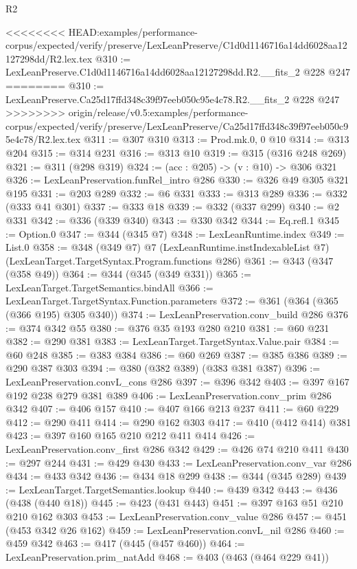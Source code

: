 \begin{lexlean}{R2}
\begin{coremodule}
{{{{{{{<<<<<<<< HEAD:examples/performance-corpus/expected/verify/preserve/LexLeanPreserve/C1d0d1146716a14dd6028aa12127298dd/R2.lex.tex
@310 := LexLeanPreserve.C1d0d1146716a14dd6028aa12127298dd.R2.__fits_2 @228 @247
========
@310 := LexLeanPreserve.Ca25d17ffd348c39f97eeb050c95e4c78.R2.__fits_2 @228 @247
>>>>>>>> origin/release/v0.5:examples/performance-corpus/expected/verify/preserve/LexLeanPreserve/Ca25d17ffd348c39f97eeb050c95e4c78/R2.lex.tex
@311 := @307 @310
@313 := Prod.mk.{0, 0} @10
@314 := @313 @204
@315 := @314 @231
@316 := @313 @10
@319 := @315 (@316 @248 @269)
@321 := @311 (@298 @319)
@324 := (acc : @205) -> (v : @10) -> @306 @321
@326 := LexLeanPreservation.funRel_intro @286
@330 := @326 @49 @305 @321 @195
@331 := @203 @289
@332 := @6 @331
@333 := @313 @289
@336 := @332 (@333 @41 @301)
@337 := @333 @18
@339 := @332 (@337 @299)
@340 := @2 @331
@342 := @336 (@339 @340)
@343 := @330 @342
@344 := Eq.refl.{1}
@345 := Option.{0}
@347 := @344 (@345 @7)
@348 := LexLeanRuntime.index
@349 := List.{0}
@358 := @348
    (@349 @7)
    @7
    (LexLeanRuntime.instIndexableList @7)
    (LexLeanTarget.TargetSyntax.Program.functions @286)
@361 := @343 (@347 (@358 @49))
@364 := @344 (@345 (@349 @331))
@365 := LexLeanTarget.TargetSemantics.bindAll
@366 := LexLeanTarget.TargetSyntax.Function.parameters
@372 := @361 (@364 (@365 (@366 @195) @305 @340))
@374 := LexLeanPreservation.conv_build @286
@376 := @374 @342 @55
@380 := @376 @35 @193 @280 @210
@381 := @60 @231
@382 := @290 @381
@383 := LexLeanTarget.TargetSyntax.Value.pair
@384 := @60 @248
@385 := @383 @384
@386 := @60 @269
@387 := @385 @386
@389 := @290 @387 @303
@394 := @380 (@382 @389) (@383 @381 @387)
@396 := LexLeanPreservation.convL_cons @286
@397 := @396 @342
@403 := @397 @167 @192 @238 @279 @381 @389
@406 := LexLeanPreservation.conv_prim @286 @342
@407 := @406 @157
@410 := @407 @166 @213 @237
@411 := @60 @229
@412 := @290 @411
@414 := @290 @162 @303
@417 := @410 (@412 @414) @381
@423 := @397 @160 @165 @210 @212 @411 @414
@426 := LexLeanPreservation.conv_first @286 @342
@429 := @426 @74 @210 @411
@430 := @297 @244
@431 := @429 @430
@433 := LexLeanPreservation.conv_var @286
@434 := @433 @342
@436 := @434 @18 @299
@438 := @344 (@345 @289)
@439 := LexLeanTarget.TargetSemantics.lookup
@440 := @439 @342
@443 := @436 (@438 (@440 @18))
@445 := @423 (@431 @443)
@451 := @397 @163 @51 @210 @210 @162 @303
@453 := LexLeanPreservation.conv_value @286
@457 := @451 (@453 @342 @26 @162)
@459 := LexLeanPreservation.convL_nil @286
@460 := @459 @342
@463 := @417 (@445 (@457 @460))
@464 := LexLeanPreservation.prim_natAdd
@468 := @403 (@463 (@464 @229 @41))
}}}}}}}
\end{coremodule}
\end{lexlean}
